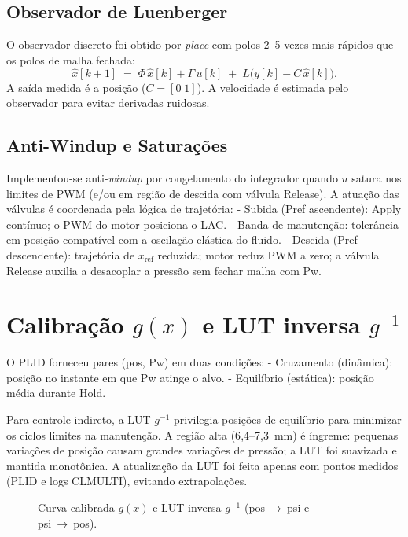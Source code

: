 \subsection{Observador de Luenberger}
O observador discreto foi obtido por \emph{place} com polos 2–5 vezes mais rápidos que os polos de malha fechada:
\begin{equation}
  \hat{x}[k+1] \;=\; \Phi\,\hat{x}[k] + \Gamma\,u[k] \;+\; L\big(y[k]-C\,\hat{x}[k]\big).
\end{equation}
A saída medida é a posição ($C = [0\;1]$). A velocidade é estimada pelo observador para evitar derivadas ruidosas.

\subsection{Anti-Windup e Saturações}
Implementou-se anti-\emph{windup} por congelamento do integrador quando $u$ satura nos limites de PWM (e/ou em região de descida com válvula Release). A atuação das válvulas é coordenada pela lógica de trajetória:
- Subida (Pref ascendente): Apply contínuo; o PWM do motor posiciona o LAC.
- Banda de manutenção: tolerância em posição compatível com a oscilação elástica do fluido.
- Descida (Pref descendente): trajetória de $x_{\text{ref}}$ reduzida; motor reduz PWM a zero; a válvula Release auxilia a desacoplar a pressão sem fechar malha com Pw.

\section{Calibração $g(x)$ e LUT inversa $g^{-1}$}
O PLID forneceu pares (pos, Pw) em duas condições:
- Cruzamento (dinâmica): posição no instante em que Pw atinge o alvo.
- Equilíbrio (estática): posição média durante Hold.

Para controle indireto, a LUT $g^{-1}$ privilegia posições de equilíbrio para minimizar os ciclos limites na manutenção. A região alta (6{,}4–7{,}3~mm) é íngreme: pequenas variações de posição causam grandes variações de pressão; a LUT foi suavizada e mantida monotônica. A atualização da LUT foi feita apenas com pontos medidos (PLID e logs CLMULTI), evitando extrapolações.

\begin{figure}[h]
  \centering
  \caption{Curva calibrada $g(x)$ e LUT inversa $g^{-1}$ (pos~→~psi e psi~→~pos).}
  \label{fig:lut}
\end{figure}

